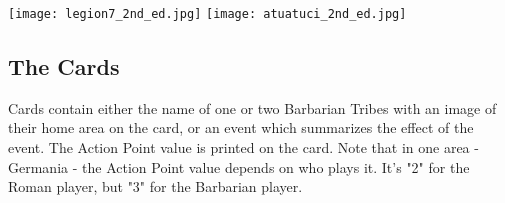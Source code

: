 \texttt{[image: legion7\_2nd\_ed.jpg]}
\hspace{1em}
\texttt{[image: atuatuci\_2nd\_ed.jpg]}

\par
\subsection{The Cards}
Cards contain either the name of one or two Barbarian Tribes with an image of their home area on the card, or an event which summarizes the effect of the event. The Action Point value is printed on the card. Note that in one area - Germania - the Action Point value depends on who plays it. It's "2" for the Roman player, but "3" for the Barbarian player.
